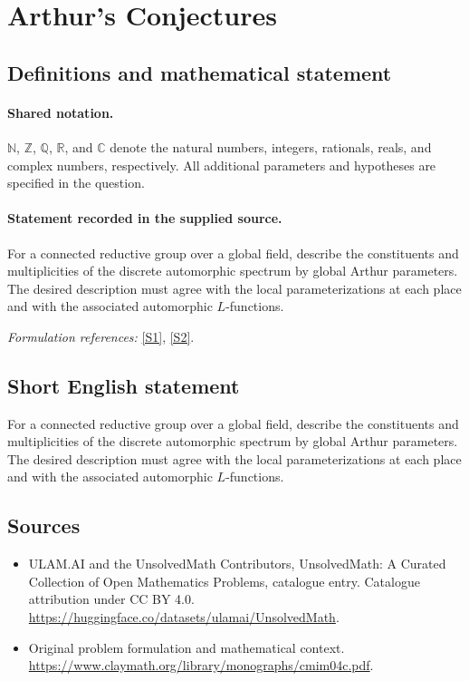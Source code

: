 \documentclass[11pt]{article}
\newcommand{\sref}[2]{\hyperlink{source:#1:#2}{[S#2]}}
\begin{document}
\section{Arthur's Conjectures}\label{statement}

\subsection{Definitions and mathematical statement}

\paragraph{Shared notation.}$\mathbb N$, $\mathbb Z$, $\mathbb Q$, $\mathbb R$, and $\mathbb C$ denote the natural numbers, integers, rationals, reals, and complex numbers, respectively. All additional parameters and hypotheses are specified in the question.


\paragraph{Statement recorded in the supplied source.}
For a connected reductive group over a global field, describe the constituents and multiplicities of the discrete automorphic spectrum by global Arthur parameters. The desired description must agree with the local parameterizations at each place and with the associated automorphic $L$-functions.
\par\smallskip\textit{Formulation references:} \sref{statement}{1}, \sref{statement}{2}.
\subsection{Short English statement}
For a connected reductive group over a global field, describe the constituents and multiplicities of the discrete automorphic spectrum by global Arthur parameters. The desired description must agree with the local parameterizations at each place and with the associated automorphic $L$-functions.
\subsection{Sources}
\begin{itemize}
\item[\hypertarget{source:statement:1}{S1}] ULAM.AI and the UnsolvedMath Contributors, UnsolvedMath: A Curated Collection of Open Mathematics Problems, catalogue entry. Catalogue attribution under CC BY 4.0.
\url{https://huggingface.co/datasets/ulamai/UnsolvedMath}.
\item[\hypertarget{source:statement:2}{S2}] Original problem formulation and mathematical context.
\url{https://www.claymath.org/library/monographs/cmim04c.pdf}.
\end{itemize}
\label{end:statement}
\end{document}
